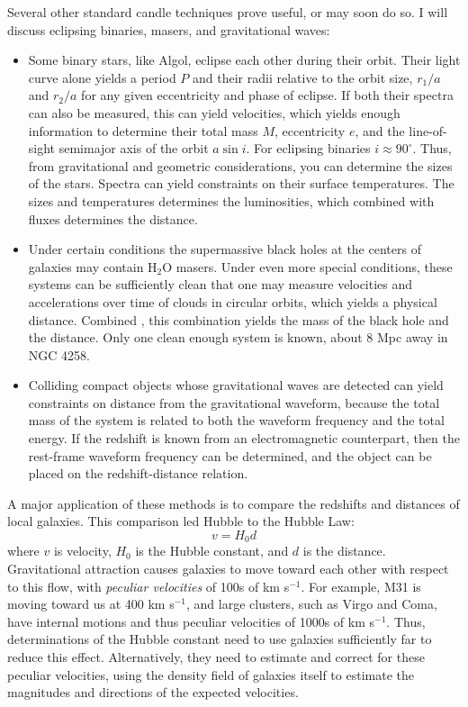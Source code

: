 Several other standard candle techniques prove useful, or may soon do
so. I will discuss eclipsing binaries, masers, and gravitational
waves:
\begin{itemize}
\item Some binary stars, like Algol, eclipse each other during their
orbit. Their light curve alone yields a period $P$ and their radii
relative to the orbit size, $r_1/a$ and $r_2/a$ for any given
eccentricity and phase of eclipse. If both their spectra can also be
measured, this can yield velocities, which yields enough information
to determine their total mass $M$, eccentricity $e$, and the
line-of-sight semimajor axis of the orbit $a \sin i$.  For eclipsing
binaries $i\approx 90^\circ$.  Thus, from gravitational and geometric
considerations, you can determine the sizes of the stars. Spectra can
yield constraints on their surface temperatures. The sizes and
temperatures determines the luminosities, which combined with fluxes
determines the distance.
\item Under certain conditions the supermassive
black holes at the centers of galaxies may contain H$_2$O
masers. Under even more special conditions, these systems can be
sufficiently clean that one may measure velocities and accelerations
over time of clouds in circular orbits, which yields a physical
distance. Combined , this combination yields
the mass of the black hole and the distance. Only one clean enough
system is known, about 8 Mpc away in NGC 4258.
\item Colliding compact objects whose gravitational waves are detected can
yield constraints on distance from the gravitational waveform, because
the total mass of the system is related to both the waveform frequency
and the total energy. If the redshift is known from an electromagnetic
counterpart, then the rest-frame waveform frequency can be determined,
and the object can be placed on the redshift-distance relation.
\end{itemize}

A major application of these methods is to compare the redshifts and
distances of local galaxies. This comparison led Hubble to the Hubble
Law:
\begin{equation}
v = H_0 d
\end{equation}
where $v$ is velocity, $H_0$ is the Hubble constant, and $d$ is the
distance. Gravitational attraction causes galaxies to move toward each
other with respect to this flow, with {\it peculiar velocities} of
100s of km s$^{-1}$. For example, M31 is moving toward us at 400 km
s$^{-1}$, and large clusters, such as Virgo and Coma, have internal
motions and thus peculiar velocities of 1000s of km s$^{-1}$. Thus,
determinations of the Hubble constant need to use galaxies
sufficiently far to reduce this effect. Alternatively, they need to
estimate and correct for these peculiar velocities, using the density
field of galaxies itself to estimate the magnitudes and directions of
the expected velocities.

